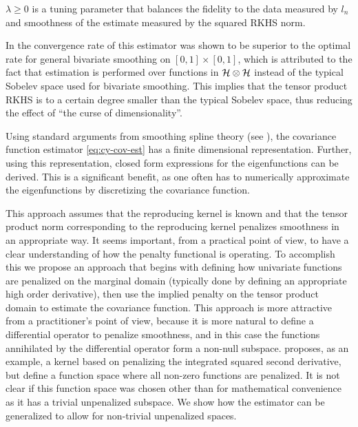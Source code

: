 $\lambda\geq0$ is a tuning parameter that balances the fidelity to the data measured by $l_{n}$ and smoothness of the estimate measured by the squared RKHS norm.

In \cite{Cai:2010vr} the convergence rate of this estimator was shown to be superior to the optimal rate for general bivariate smoothing on $[0,1]\times[0,1]$, which is attributed to the fact that estimation is performed over functions in $\mathcal{H} \otimes \mathcal{H}$ instead of the typical Sobelev space used for bivariate smoothing. This implies that the tensor product RKHS is to a certain degree smaller than the typical Sobelev space, thus reducing the effect of ``the curse of dimensionality''.

Using standard arguments from smoothing spline theory (see \cite{Wahba:1990}), the covariance function estimator \eqref{eq:cy-cov-est} has a finite dimensional representation. Further, using this representation, closed form expressions for the eigenfunctions can be derived. This is a significant benefit, as one often has to numerically approximate the eigenfunctions by discretizing the covariance function.

This approach assumes that the reproducing kernel is known and that the tensor product norm corresponding to the reproducing kernel penalizes smoothness in an appropriate way. It seems important, from a practical point of view, to have a clear understanding of how the penalty functional is operating. To accomplish this we propose an approach that begins with defining how univariate functions are penalized on the marginal domain (typically done by defining an appropriate high order derivative), then use the implied penalty on the tensor product domain to estimate the covariance function. This approach is more attractive from a practitioner's point of view, because it is more natural to define a differential operator to penalize smoothness, and in this case the functions annihilated by the differential operator form a non-null subspace. \cite{Cai:2010vr} proposes, as an example, a kernel based on penalizing the integrated squared second derivative, but define a function space where all non-zero functions are penalized. It is not clear if this function space was chosen other than for mathematical convenience as it has a trivial unpenalized subspace. We show how the estimator can be generalized to allow for non-trivial unpenalized spaces. 

